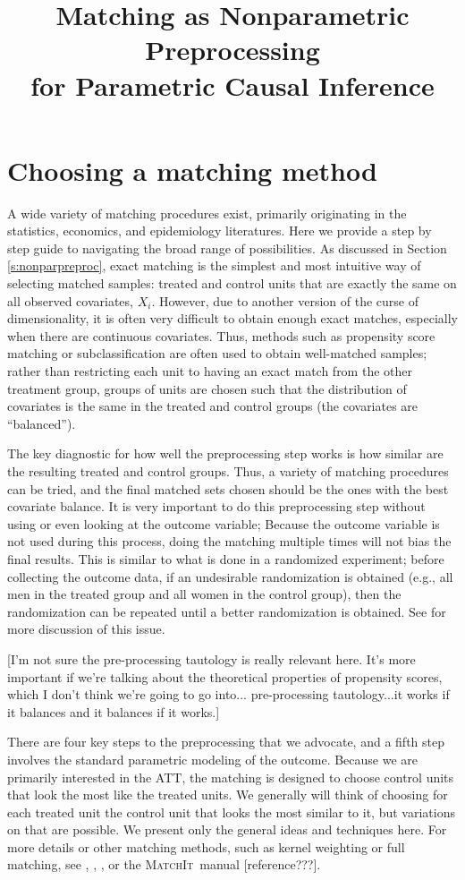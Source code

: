 \documentclass[11pt,titlepage]{article}
\title{Matching as Nonparametric Preprocessing\\
for Parametric Causal Inference}
\newcommand{\MatchIt}{\textsc{MatchIt}}
\begin{document}
\baselineskip

\section{Choosing a matching method}
A wide variety of matching procedures exist, primarily originating in
the statistics, economics, and epidemiology literatures.  Here we
provide a step by step guide to navigating the broad range of
possibilities.  As discussed in Section \ref{s:nonparpreproc}, exact
matching is the simplest and most intuitive way of selecting matched
samples: treated and control units that are exactly the same on all
observed covariates, $X_i$.  However, due to another version of the
curse of dimensionality, it is often very difficult to obtain enough
exact matches, especially when there are continuous covariates.  Thus,
methods such as propensity score matching or subclassification are
often used to obtain well-matched samples; rather than restricting
each unit to having an exact match from the other treatment group,
groups of units are chosen such that the distribution of covariates is
the same in the treated and control groups (the covariates are
``balanced'').

The key diagnostic for how well the preprocessing step works is how
similar are the resulting treated and control groups.  Thus, a variety
of matching procedures can be tried, and the final matched sets chosen
should be the ones with the best covariate balance.  It is very
important to do this preprocessing step without using or even looking
at the outcome variable; Because the outcome variable is not used
during this process, doing the matching multiple times will not bias
the final results.  This is similar to what is done in a randomized
experiment; before collecting the outcome data, if an undesirable
randomization is obtained (e.g., all men in the treated group and all
women in the control group), then the randomization can be repeated
until a better randomization is obtained.  See \cite{Rubin01} for more
discussion of this issue.

[I'm not sure the pre-processing tautology is really relevant here.
It's more important if we're talking about the theoretical properties
of propensity scores, which I don't think we're going to go into...
pre-processing tautology...it works if it balances and it balances if
it works.]

There are four key steps to the preprocessing that we advocate, and a
fifth step involves the standard parametric modeling of the outcome.
Because we are primarily interested in the ATT, the matching is
designed to choose control units that look the most like the treated
units.  We generally will think of choosing for each treated unit the
control unit that looks the most similar to it, but variations on that
are possible.  We present only the general ideas and techniques here.
For more details or other matching methods, such as kernel weighting
or full matching, see \cite{Imbens04}, \cite{Stuart04},
\cite{Rosenbaum02}, or the \MatchIt\ manual [reference???].
\end{document}
